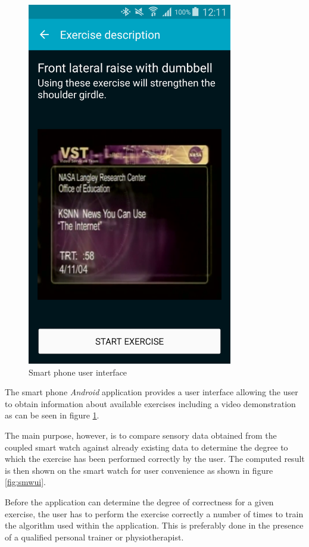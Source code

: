 \begin{figure}[t!]
\begin{minipage}{0.25\textwidth}
        \includegraphics[width=0.80\textwidth]{00_resources/figures/Android_Phone_DescriptionView.png}
    \end{minipage}
  \caption{Smart phone user interface}
  \label{fig:smpui}
\end{figure}

The smart phone \textit{Android} application provides a user interface allowing
the user to obtain information about available exercises including a video
demonstration as can be seen in figure \ref{fig:smpui}.

The main purpose, however, is to compare sensory data obtained from the coupled
smart watch against already existing data to determine the degree to which
the exercise has been performed correctly by the user. The computed result is
then shown on the smart watch for user convenience as shown in figure
\ref{fig:smwui}.

Before the application can determine the degree of correctness for a given
exercise, the user has to perform the exercise correctly a number of times to
train the algorithm used within the application. This is preferably done in
the presence of a qualified personal trainer or physiotherapist.
